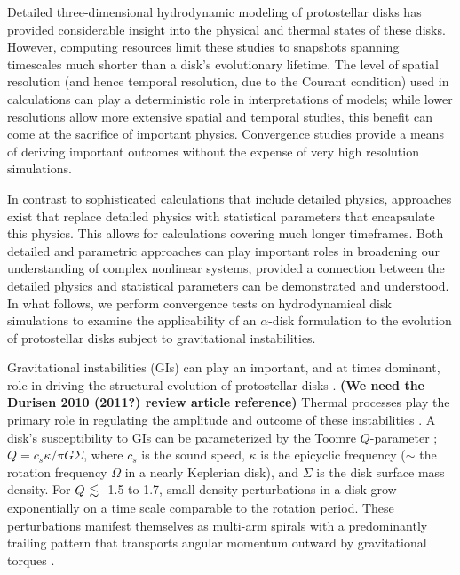 \documentclass[manuscript]{aastex}
\newcommand{\al}{\mbox{ \raisebox{-.8ex}{$\stackrel{\textstyle <}{\sim}$} }}
\begin{document}
Detailed three-dimensional hydrodynamic modeling of protostellar disks has provided considerable insight into the physical and thermal states of these disks.  However,  computing resources limit these studies to snapshots spanning timescales much shorter than a disk's evolutionary lifetime. The level of spatial resolution (and hence temporal resolution, due to the Courant condition) used in calculations can play a deterministic role in interpretations of models; while lower resolutions allow more extensive spatial and temporal studies, this benefit can come at the sacrifice of important physics.  Convergence studies provide a means 
of deriving important outcomes without the expense of very high resolution simulations.  

In contrast to sophisticated calculations that include detailed physics, 
approaches exist that replace detailed physics with statistical parameters that encapsulate this physics.  This
allows for calculations covering much longer timeframes.  Both detailed and 
parametric
approaches can play important roles in broadening our understanding of complex nonlinear systems, provided a connection between the detailed physics and statistical parameters can be demonstrated and understood. In what follows, we perform convergence 
tests on hydrodynamical disk simulations to examine the applicability of an $\alpha$-disk 
formulation \citep{shakura1973} to  the
evolution of protostellar disks subject to gravitational instabilities.   


Gravitational instabilities (GIs) can play an important, and at times dominant, role in driving the structural 
evolution of  protostellar disks \citep[for reviews, see][]{durisen2005, durisen2010}. {\bf (We need the Durisen 2010 (2011?)
review article reference)}
Thermal processes play the primary role in regulating the amplitude and outcome of these instabilities \citep{pickett1998,pickett2000,mejia2005,nelson1998,nelson2000a}. A disk's susceptibility to GIs can be parameterized by the Toomre $Q$-parameter \citep{toomre1981};  $Q = c_s \kappa / \pi G \Sigma$, where $c_s$ is the sound speed, $\kappa$ is the epicyclic frequency ($\sim$ the rotation frequency 
$\Omega$ in a nearly Keplerian disk), and $\Sigma$ is the disk surface mass density. For $Q \al$  1.5 to 1.7,  small density perturbations in a disk grow exponentially on a time scale comparable to the rotation period. These perturbations manifest themselves as multi-arm spirals with a predominantly trailing pattern that transports angular momentum outward by gravitational torques \citep{larson1984,boss1984,durisen1986,papaloizou1991, laughlin1994,nelson1998,pickett1998}. 
\end{document}
